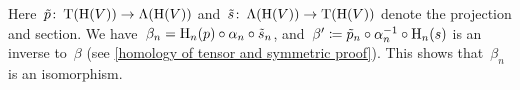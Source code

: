 \documentclass[a4paper,10pt,headings=standardclasses]{scrartcl}
\begin{document}
\begin{example}
\begin{enumerate}
      Here~$\tilde{p} \colon \operatorname{T}(\operatorname{H}(V)) \to \operatorname{\Lambda}(\operatorname{H}(V))$ and~$\tilde{s} \colon \operatorname{\Lambda}(\operatorname{H}(V)) \to \operatorname{T}(\operatorname{H}(V))$ denote the projection and section.
      We have~$\beta_n = \operatorname{H}_n(p) \circ \alpha_n \circ \tilde{s}_n$, and~$\beta' \coloneqq \tilde{p}_n \circ \alpha_n^{-1} \circ \operatorname{H}_n(s)$ is an inverse to~$\beta$ (see \cref{homology of tensor and symmetric proof}).
      This shows that~$\beta_n$ is an isomorphism.
  \end{enumerate}
\end{example}


\end{document}
